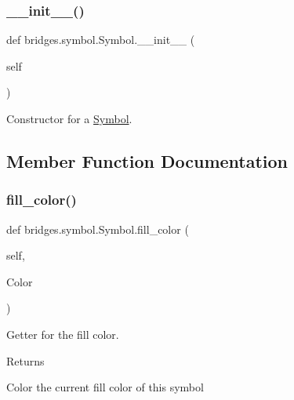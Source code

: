 \subsubsection{\texorpdfstring{\+\_\+\+\_\+init\+\_\+\+\_\+()}{\_\_init\_\_()}}
{\footnotesize\ttfamily def bridges.\+symbol.\+Symbol.\+\_\+\+\_\+init\+\_\+\+\_\+ (\begin{DoxyParamCaption}\item[{}]{self }\end{DoxyParamCaption})}



Constructor for a \hyperlink{classbridges_1_1symbol_1_1_symbol}{Symbol}. 



\subsection{Member Function Documentation}
\mbox{\label{classbridges_1_1symbol_1_1_symbol_a1a5e9147e426fb7ec74fe60a5cdc9ded}} 
\subsubsection{\texorpdfstring{fill\+\_\+color()}{fill\_color()}\hspace{0.1cm}{\footnotesize\ttfamily [1/2]}}
{\footnotesize\ttfamily def bridges.\+symbol.\+Symbol.\+fill\+\_\+color (\begin{DoxyParamCaption}\item[{}]{self,  }\item[{}]{Color }\end{DoxyParamCaption})}



Getter for the fill color. 

\begin{DoxyReturn}{Returns}


Color the current fill color of this symbol 
\end{DoxyReturn}
\mbox{\label{classbridges_1_1symbol_1_1_symbol_acec37468f0018db1416622062983eb46}} 
